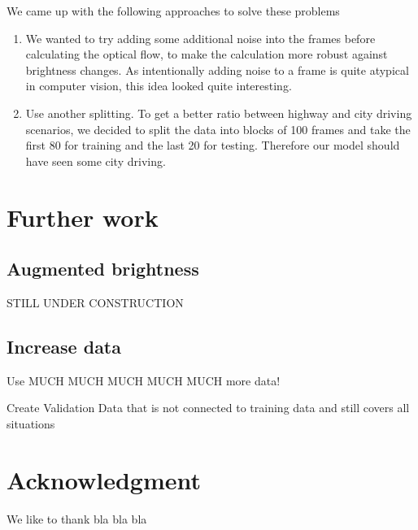 \documentclass[conference]{IEEEtran}
\begin{document}
We came up with the following approaches to solve these problems
\begin{enumerate}[label=(\roman*)]
	\item We wanted to try adding some additional noise into the frames before calculating the optical flow, to make the calculation
	more robust against brightness changes. As intentionally adding 
	noise to a frame is quite atypical in computer vision, this idea looked quite interesting.
	\item Use another splitting. To get a better ratio between highway and city driving scenarios, we decided to split the data into
	blocks of 100 frames and take the first 80 for training and the last 20 for testing. Therefore our model should have seen some city
	driving.
\end{enumerate}




\section{Further work}

\subsection{Augmented brightness}
STILL UNDER CONSTRUCTION

\subsection{Increase data}

Use MUCH MUCH MUCH MUCH MUCH more data!

Create Validation Data that is not connected to training data and still covers all situations


\section*{Acknowledgment}
We like to thank bla bla bla




\printbibliography
\end{document}
